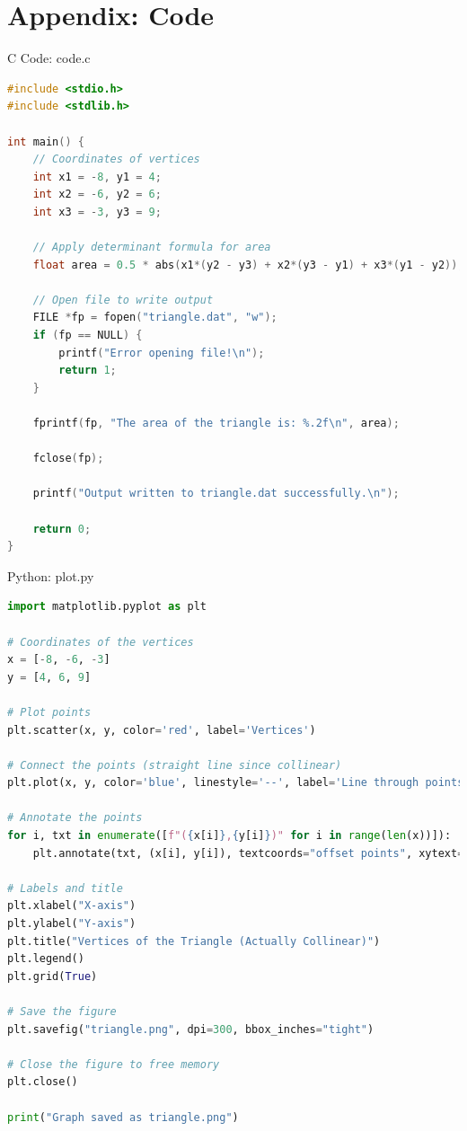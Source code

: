 \documentclass{beamer}
\numberwithin{equation}{section}
\theoremstyle{remark}
\begin{document}
\section*{Appendix: Code}

\begin{frame}[fragile]{C Code: code.c}
\begin{lstlisting}[language=C]
#include <stdio.h>
#include <stdlib.h>

int main() {
    // Coordinates of vertices
    int x1 = -8, y1 = 4;
    int x2 = -6, y2 = 6;
    int x3 = -3, y3 = 9;

    // Apply determinant formula for area
    float area = 0.5 * abs(x1*(y2 - y3) + x2*(y3 - y1) + x3*(y1 - y2));

    // Open file to write output
    FILE *fp = fopen("triangle.dat", "w");
    if (fp == NULL) {
        printf("Error opening file!\n");
        return 1;
    }

    fprintf(fp, "The area of the triangle is: %.2f\n", area);

    fclose(fp);

    printf("Output written to triangle.dat successfully.\n");

    return 0;
}

\end{lstlisting}
\end{frame}

\begin{frame}[fragile]{Python: plot.py}
\begin{lstlisting}[language=Python]
import matplotlib.pyplot as plt

# Coordinates of the vertices
x = [-8, -6, -3]
y = [4, 6, 9]

# Plot points
plt.scatter(x, y, color='red', label='Vertices')

# Connect the points (straight line since collinear)
plt.plot(x, y, color='blue', linestyle='--', label='Line through points')

# Annotate the points
for i, txt in enumerate([f"({x[i]},{y[i]})" for i in range(len(x))]):
    plt.annotate(txt, (x[i], y[i]), textcoords="offset points", xytext=(5,5))

# Labels and title
plt.xlabel("X-axis")
plt.ylabel("Y-axis")
plt.title("Vertices of the Triangle (Actually Collinear)")
plt.legend()
plt.grid(True)

# Save the figure
plt.savefig("triangle.png", dpi=300, bbox_inches="tight")

# Close the figure to free memory
plt.close()

print("Graph saved as triangle.png")



\end{lstlisting}
\end{frame}
\end{document}
